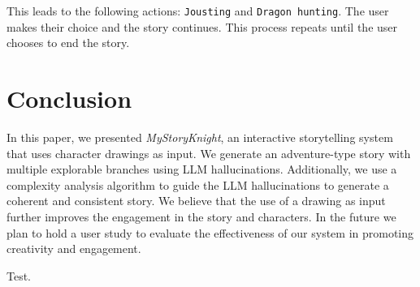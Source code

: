 \documentclass[submit,techrep,english]{ipsj}
\begin{document}
\vspace{10pt} %

This leads to the following actions: \verb|Jousting| and \verb|Dragon hunting|. The user makes their choice and the story continues. This process repeats until the user chooses to end the story.

\section{Conclusion}
\label{sec:conclusion}
In this paper, we presented \textit{MyStoryKnight}, an interactive storytelling system that uses character drawings as input. We generate an adventure-type story with multiple explorable branches using LLM hallucinations. Additionally, we use a complexity analysis algorithm to guide the LLM hallucinations to generate a coherent and consistent story. We believe that the use of a drawing as input further improves the engagement in the story and characters. In the future we plan to hold a user study to evaluate the effectiveness of our system in promoting creativity and engagement.

\begin{acknowledgment}
    Test.
\end{acknowledgment}




\appendix
\end{document}
